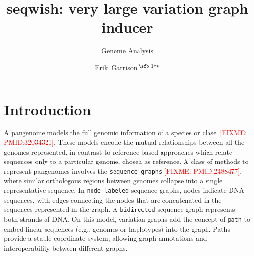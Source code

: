 \documentclass{bioinfo}
\newcommand{\red}[1]{{\textcolor{Red}{#1}}}
\newcommand{\FIXME}[1]{\red{[FIXME: #1]}}
\begin{document}

    \subtitle{Genome Analysis}

    \title[seqwish: very large variation graph inducer]{seqwish: very large variation graph inducer}
    \author[Garrison \textit{et~al}.]{
        Erik~Garrison\,$^{\text{\sfb 1} \dagger*}$
    }

    \address{
        $^{\text{\sf 1}}$University of Tennessee Health Science Center, Memphis, TN, USA
    }





    \maketitle


    \section{Introduction}
    \label{sec:introduction}
    A pangenome models the full genomic information of a species or clase~\FIXME{PMID:32034321}.
    These models encode the mutual relationships between all the genomes represented, in contrast to reference-based approaches which relate sequences only to a particular genome, chosen as reference.
    A class of methods to represent pangenomes involves the \texttt{sequence graphs} \FIXME{PMID:2488477}, where similar orthologous regions between genomes collapse into a single representative sequence.
    In \texttt{node-labeled} sequence graphs, nodes indicate DNA sequences, with edges connecting the nodes that are concatenated in the sequences represented in the graph.
    A \texttt{bidirected} sequence graph represents both strands of DNA.
    On this model, variation graphs add the concept of \texttt{path} to embed linear sequences (e.g., genomes or haplotypes) into the graph\citep{Garrison:2018}.
    Paths provide a stable coordinate system, allowing graph annotations and interoperability between different graphs.
\end{document}

